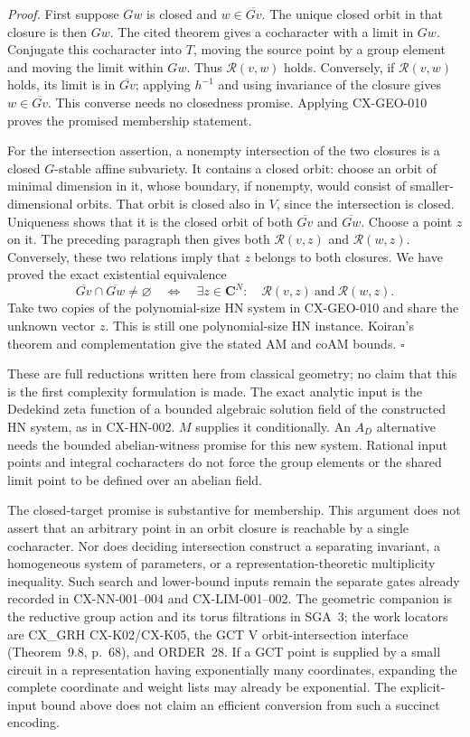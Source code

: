 \documentclass[11pt,a4paper]{article}
\begin{document}
\emph{Proof.} First suppose $Gw$ is closed and
$w\in\overline{Gv}$. The unique closed orbit in that closure is then
$Gw$. The cited theorem gives a cocharacter with a limit in $Gw$.
Conjugate this cocharacter into $T$, moving the source point by a group
element and moving the limit within $Gw$. Thus $\mathcal R(v,w)$
holds. Conversely, if $\mathcal R(v,w)$ holds, its limit is in
$\overline{Gv}$; applying $h^{-1}$ and using invariance of the closure
gives $w\in\overline{Gv}$. This converse needs no closedness promise.
Applying CX-GEO-010 proves the promised membership statement.

For the intersection assertion, a nonempty intersection of the two
closures is a closed $G$-stable affine subvariety. It contains a closed
orbit: choose an orbit of minimal dimension in it, whose boundary, if
nonempty, would consist of smaller-dimensional orbits. That orbit is
closed also in $V$, since the intersection is closed. Uniqueness shows
that it is the closed orbit of both $\overline{Gv}$ and
$\overline{Gw}$. Choose a point $z$ on it. The preceding paragraph
then gives both $\mathcal R(v,z)$ and $\mathcal R(w,z)$.
Conversely, these two relations imply that $z$ belongs to both closures.
We have proved the exact existential equivalence
\[
 \overline{Gv}\cap\overline{Gw}\ne\varnothing
       \quad\Longleftrightarrow\quad
       \exists z\in\mathbf C^N:\quad
                  \mathcal R(v,z)\ \text{and}\ \mathcal R(w,z).
\]
Take two copies of the polynomial-size HN system in CX-GEO-010 and share
the unknown vector $z$. This is still one polynomial-size HN instance.
Koiran's theorem and complementation give the stated AM and coAM bounds.
\hfill$\square$

These are full reductions written here from classical geometry; no claim
that this is the first complexity formulation is made. The exact analytic
input is the Dedekind zeta function of a bounded algebraic solution field
of the constructed HN system, as in CX-HN-002. $M$ supplies it
conditionally. An $A_D$ alternative needs the bounded abelian-witness
promise for this new system. Rational input points and integral
cocharacters do not force the group elements or the shared limit point
to be defined over an abelian field.

The closed-target promise is substantive for membership. This argument
does not assert that an arbitrary point in an orbit closure is reachable
by a single cocharacter. Nor does deciding intersection construct a
separating invariant, a homogeneous system of parameters, or a
representation-theoretic multiplicity inequality. Such search and
lower-bound inputs remain the separate gates already recorded in
CX-NN-001--004 and CX-LIM-001--002. The geometric companion is the
reductive group action and its torus filtrations in SGA~3; the work
locators are CX\_GRH CX-K02/CX-K05, the GCT V orbit-intersection
interface (Theorem~9.8, p.~68), and ORDER~28.
If a GCT point is supplied by a small circuit in a representation having
exponentially many coordinates, expanding the complete coordinate and
weight lists may already be exponential. The explicit-input bound above
does not claim an efficient conversion from such a succinct encoding.
\end{document}
